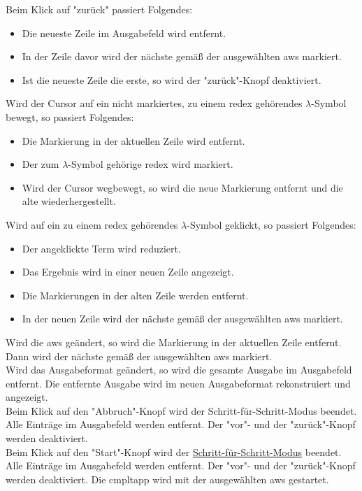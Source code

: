 \documentclass[parskip=full,11pt,twoside]{scrartcl}
\begin{document}
Beim Klick auf "zurück" passiert Folgendes:
\begin{itemize}
	\item Die neueste Zeile im Ausgabefeld wird entfernt.
	\item In der Zeile davor wird der nächste  gemäß der ausgewählten \gls{aws} markiert.
	\item Ist die neueste Zeile die erste, so wird der "zurück"-Knopf deaktiviert.
\end{itemize}

Wird der Cursor auf ein nicht markiertes, zu einem \gls{redex} gehörendes $\lambda$-Symbol bewegt, so passiert Folgendes:
\begin{itemize}
	\item Die Markierung in der aktuellen Zeile wird entfernt.
	\item Der zum $\lambda$-Symbol gehörige \gls{redex} wird markiert.
	\item Wird der Cursor wegbewegt, so wird die neue Markierung entfernt und die alte wiederhergestellt.
\end{itemize}

Wird auf ein zu einem \gls{redex} gehörendes $\lambda$-Symbol geklickt, so passiert Folgendes:
\begin{itemize}
	\item Der angeklickte Term wird reduziert.
	\item Das Ergebnis wird in einer neuen Zeile angezeigt.
	\item Die Markierungen in der alten Zeile werden entfernt.
	\item In der neuen Zeile wird der nächste  gemäß der ausgewählten \gls{aws} markiert.
\end{itemize}

Wird die \gls{aws} geändert, so wird die Markierung in der aktuellen Zeile entfernt.
Dann wird der nächste  gemäß der ausgewählten \gls{aws} markiert.\\
Wird das Ausgabeformat geändert, so wird die gesamte Ausgabe im Ausgabefeld entfernt.
Die entfernte Ausgabe wird im neuen Ausgabeformat rekonstruiert und angezeigt.\\
Beim Klick auf den "Abbruch"-Knopf wird der Schritt-für-Schritt-Modus beendet.
Alle Einträge im Ausgabefeld werden entfernt.
Der "vor"- und der "zurück"-Knopf werden deaktiviert.\\
Beim Klick auf den "Start"-Knopf wird der \hyperref[fnc:steps]{Schritt-für-Schritt-Modus} beendet.
Alle Einträge im Ausgabefeld werden entfernt.
Der "vor"- und der "zurück"-Knopf werden deaktiviert.
Die \gls{cmpltapp} wird mit der ausgewählten \gls{aws} gestartet.
\end{document}
